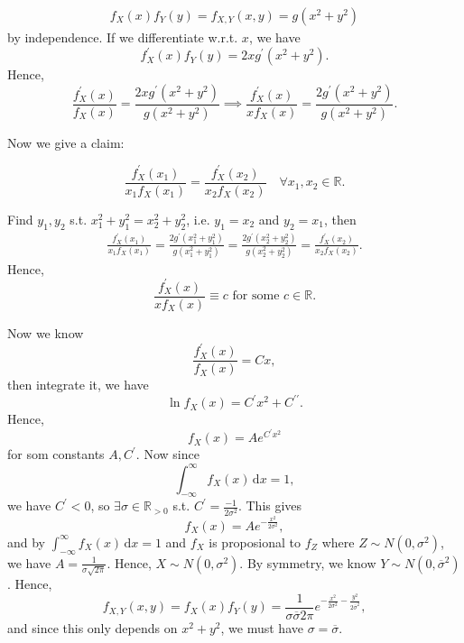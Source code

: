 \begin{explanation}
    \begin{align*}
        f_X(x) f_Y(y) = f_{X, Y}(x, y) = g(x^2 + y^2)
    \end{align*}
    by independence. If we differentiate w.r.t. \(x\), we have 
    \[
        f_X^{\prime} (x) f_Y(y) = 2x g^{\prime} (x^2 + y^2).
    \] 
    Hence,
    \[
        \frac{f_X^{\prime} (x)}{f_X (x)} = \frac{2x g^{\prime} (x^2 + y^2)}{g(x^2 + y^2)} \implies \frac{f^{\prime}_X(x)}{x f_X(x)} = \frac{2 g^{\prime} (x^2 + y^2)}{g(x^2 + y^2)}.
    \]

     Now we give a claim: 
     \begin{claim}
    \[
        \frac{f_X^{\prime} (x_1)}{x_1 f_X(x_1)} = \frac{f_X^{\prime} (x_2)}{x_2 f_X(x_2)} \quad \forall x_1, x_2 \in \mathbb{R}.
    \]
    \end{claim}
    \begin{explanation}
        Find \(y_1, y_2\) s.t. \(x_1^2 + y_1^2 = x^2_2 + y_2^2\), i.e. \(y_1 = x_2\) and \(y_2 = x_1\), then 
        \begin{align*}
            \frac{f_X^{\prime} (x_1)}{x_1 f_X(x_1)} = \frac{2 g^{\prime} (x_1^2 + y_1^2)}{g(x_1^2 + y_1^2)} = \frac{2 g^{\prime} (x_2^2 + y_2^2)}{g(x_2^2 + y_2^2)} = \frac{f_X^{\prime} (x_2)}{x_2 f_X(x_2)}.
        \end{align*}   
        Hence,
        \[
            \frac{f_X^{\prime} (x)}{x f_X(x)} \equiv c \text{ for some } c \in \mathbb{R}. 
        \] 
    \end{explanation}
    Now we know 
    \[
        \frac{f_X^{\prime} (x)}{f_X(x)} = Cx,
    \]
    then integrate it, we have 
    \[
        \ln f_X(x) = C^{\prime} x^2 + C^{\prime\prime}.
    \]
    Hence,
    \[
        f_X(x) = A e^{C^{\prime} x^2}
    \]
    for som constants \(A, C^{\prime}\). Now since 
    \[
        \int _{-\infty }^{\infty} f_X(x) \, \mathrm{d} x = 1, 
    \]
    we have \(C^{\prime} < 0\), so \(\exists \sigma \in \mathbb{R} _{> 0}\) s.t. \(C^{\prime} = \frac{-1}{2 \sigma ^2}\). This gives
    \[
        f_X(x) = A e^{- \frac{x^2}{2 \sigma ^2}},
    \]    
    and by \(\int _{-\infty }^{\infty} f_X(x) \, \mathrm{d} x  = 1\) and \(f_X\) is proposional to \(f_Z\) where \(Z \sim N(0, \sigma ^2)\), we have \(A = \frac{1}{\sigma \sqrt{2 \pi} }\). Hence, \(X \sim N(0, \sigma ^2)\). By symmetry, we know \(Y \sim N(0, \overline{\sigma} ^2)\). Hence, 
    \[
        f_{X, Y}(x, y) = f_X(x) f_Y(y) = \frac{1}{\sigma \overline{\sigma} 2 \pi} e^{- \frac{x^2}{2 \sigma ^2} - \frac{y^2}{2 \overline{\sigma}^2}},
    \]    
    and since this only depends on \(x^2 + y^2\), we must have \(\sigma = \overline{\sigma}\).  

\end{explanation}
